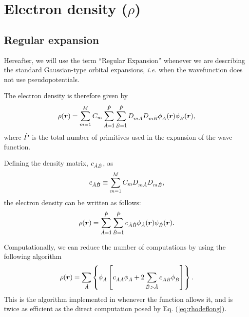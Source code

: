 \section{Electron density ($\rho$)}

\subsection{Regular expansion}

Hereafter, we will use the term ``Regular Expansion'' whenever we are describing
the standard Gaussian-type orbital expansions, \textit{i.e.} when the wavefunction
does not use pseudopotentials.

The electron density is therefore given by
%
\begin{equation}
   \rho(\boldsymbol{r})=\sum_{m=1}^{M}C_m\sum_{\dot{A}=\dot{1}}^{\dot{P}}\sum_{\dot{B}=\dot{1}}^{\dot{P}}D_{m\dot{A}}D_{m\dot{B}}
                        \phi_{\dot{A}}(\boldsymbol{r})\phi_{\dot{B}}(\boldsymbol{r}),
\end{equation}
%
where $\dot{P}$ is the total number of primitives used in the expansion of the wave function.

Defining the density matrix, $c_{\dot{A}\dot{B}}$, as
%
\begin{equation}
   c_{\dot{A}\dot{B}}\equiv\sum_{m=1}^{M}C_mD_{m\dot{A}}D_{m\dot{B}},
\end{equation}
%
the electron density can be written as follows:
%
\begin{equation}\label{eq:rhodeflong}
   \rho(\boldsymbol{r})=\sum_{\dot{A}=\dot{1}}^{\dot{P}}\sum_{\dot{B}=\dot{1}}^{\dot{P}}
      c_{\dot{A}\dot{B}}\phi_{\dot{A}}(\boldsymbol{r})\phi_{\dot{B}}(\boldsymbol{r}).
\end{equation}
%

Computationally, we can reduce the number of computations by using the following algorithm
%
\begin{equation}
   \rho(\boldsymbol{r})=\sum_{\dot{A}}\left\{\phi_{\dot{A}}\left[c_{\dot{A}\dot{A}}\phi_{\dot{A}}+2\sum_{\dot{B}>\dot{A}}c_{\dot{A}\dot{B}}\phi_{\dot{B}}\right]\right\}.
\end{equation}
%
This is the algorithm implemented in \DTK{} whenever the function allows it, and is twice as efficient as the direct computation posed by Eq. (\ref{eq:rhodeflong}).

